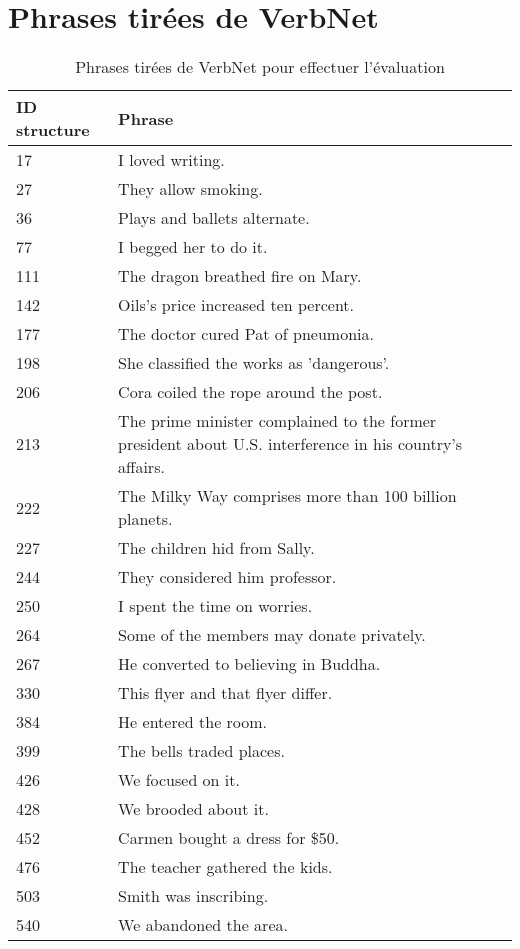 \chapter{Phrases tirées de VerbNet}
\begin{longtable}{llr}
\caption{Phrases tirées de VerbNet pour effectuer l'évaluation}
 \toprule
 ID structure & Phrase\\
 \midrule
 17	&	I loved writing.	\\
27	&	They allow smoking.	\\
36	&	Plays and ballets alternate.	\\
77	&	I begged her to do it.	\\
111	&	The dragon breathed fire on Mary.	\\
142	&	Oils's price increased ten percent.	\\
177	&	The doctor cured Pat of pneumonia.	\\
198	&	She classified the works as 'dangerous'.	\\
206	&	Cora coiled the rope around the post.	\\
213	&	The prime minister complained to the former president about U.S. 
      interference in his country's affairs.	\\
222	&	The Milky Way comprises more than 100 billion planets.	\\
227	&	The children hid from Sally.	\\
244	&	They considered him professor.	\\
250	&	I spent the time on worries.	\\
264	&	Some of the members may donate privately.	\\
267	&	He converted to believing in Buddha.	\\
330	&	This flyer and that flyer differ.	\\
384	&	He entered the room.	\\
399	&	The bells traded places.	\\
426	&	We focused on it.	\\
428	&	We brooded about it.	\\
452	&	Carmen bought a dress for \$50.	\\
476	&	The teacher gathered the kids.	\\
503	&	Smith was inscribing.	\\
540	&	We abandoned the area.	\\

\end{longtable}
